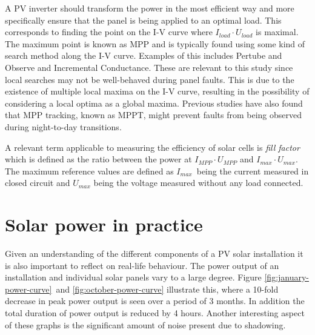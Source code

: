 A PV inverter should transform the power in the most efficient way and more specifically ensure that the panel is being applied to an optimal load.
This corresponds to finding the point on the I-V curve where $I_{load} \cdot U_{load}$ is maximal.
The maximum point is known as MPP and is typically found using some kind of search method along the I-V curve.
Examples of this includes Pertube and Observe and Incremental Conductance\cite{Roman2006}.
These are relevant to this study since local searches may not be well-behaved during panel faults\cite{Roman2006}.
This is due to the existence of multiple local maxima on the I-V curve, resulting in the possibility of considering a local optima as a global maxima.
Previous studies have also found that MPP tracking, known as MPPT, might prevent faults from being observed during night-to-day transitions\cite{Zhao2010night}.

A relevant term applicable to measuring the efficiency of solar cells is \emph{fill factor} which is defined as the ratio between the power at $I_{MPP} \cdot U_{MPP}$ and $I_{max} \cdot U_{max}$.
The maximum reference values are defined as $I_{max}$ being the current measured in closed circuit and $U_{max}$ being the voltage measured without any load connected.


\section{Solar power in practice}
Given an understanding of the different components of a PV solar installation it is also important to reflect on real-life behaviour.
The power output of an installation and individual solar panels vary to a large degree.
Figure \ref{fig:january-power-curve} and \ref{fig:october-power-curve} illustrate this, where a 10-fold decrease in peak power output is seen over a period of 3 months.
In addition the total duration of power output is reduced by 4 hours.
Another interesting aspect of these graphs is the significant amount of noise present due to shadowing.

\begin{figure}[here]
\centering
{}
~
\end{figure}

